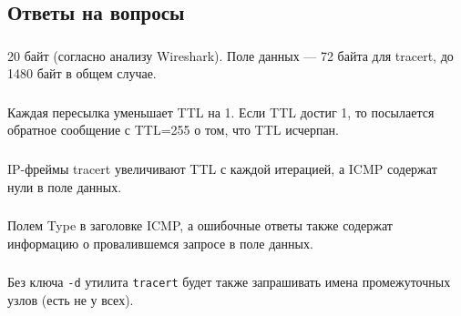 \begin{center}
\end{center}

\subsection{Ответы на вопросы}

\subsubsection{}
20 байт (согласно анализу Wireshark).
Поле данных --- 72 байта для tracert, до 1480 байт в общем случае.

\subsubsection{}
Каждая пересылка уменьшает TTL на 1.
Если TTL достиг 1, то посылается обратное сообщение с TTL=255 о том, что TTL исчерпан.

\subsubsection{}
IP-фреймы tracert увеличивают TTL с каждой итерацией, а ICMP содержат нули в поле данных.

\subsubsection{}
Полем Type в заголовке ICMP, а ошибочные ответы также содержат информацию о провалившемся запросе в поле данных.

\subsubsection{}
Без ключа \texttt{-d} утилита \texttt{tracert} будет также запрашивать имена промежуточных узлов (есть не у всех).
